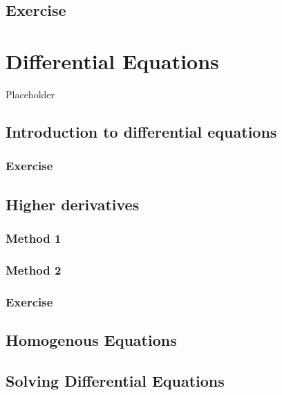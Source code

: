 \documentclass[
]{book}
\theoremstyle{definition}
\theoremstyle{definition}
\theoremstyle{definition}
\theoremstyle{definition}
\theoremstyle{remark}
\begin{document}
\section{Exercise}\label{exercise-7}

\chapter{Differential Equations}\label{differential-equations}

Placeholder

\section{Introduction to differential equations}\label{introduction-to-differential-equations}

\subsection{Exercise}\label{exercise-8}

\section{Higher derivatives}\label{higher-derivatives}

\subsection{Method 1}\label{method-1}

\subsection{Method 2}\label{method-2}

\subsection{Exercise}\label{exercise-9}

\section{Homogenous Equations}\label{homogenous-equations}

\section{Solving Differential Equations}\label{solving-differential-equations}
\end{document}
